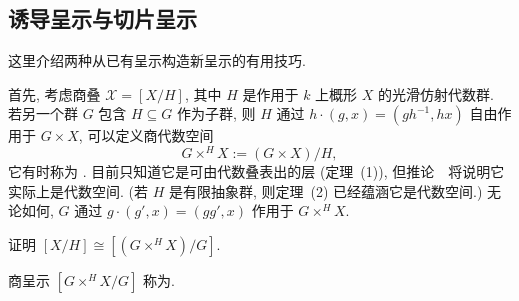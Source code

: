 \subsection{诱导呈示与切片呈示}\label{src:4.4.3-subsection}
这里介绍两种从已有呈示构造新呈示的有用技巧.

首先, 考虑商叠 $\mathcal X=[X/H]$, 其中 $H$ 是作用于 $k$ 上概形 $X$ 的光滑仿射代数群. 若另一个群 $G$ 包含 $H\subseteq G$ 作为子群, 则 $H$ 通过 $h\cdot(g,x)=(gh^{-1},hx)$ 自由作用于 $G\times X$, 可以定义商代数空间
\[
G\times^H X:=(G\times X)/H,
\]
它有时称为 . 目前只知道它是可由代数叠表出的层 (定理~(1)), 但推论~~将说明它实际上是代数空间. (若 $H$ 是有限抽象群, 则定理~(2) 已经蕴涵它是代数空间.) 无论如何, $G$ 通过 $g\cdot(g',x)=(gg',x)$ 作用于 $G\times^H X$.
\begin{exercise}\label{src:4.4.19}
证明 $[X/H]\cong[(G\times^H X)/G]$.
\end{exercise}
商呈示 $[G\times^H X/G]$ 称为.

